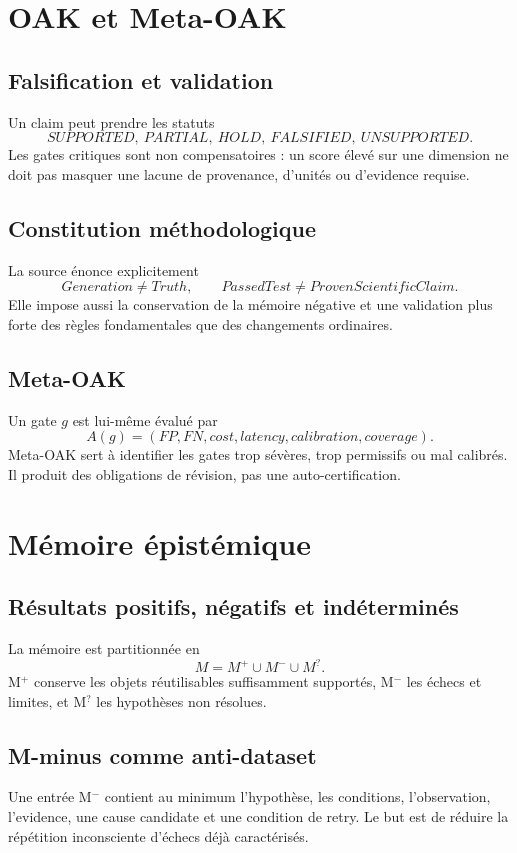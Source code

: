 \chapter{OAK et Meta-OAK}

\section{Falsification et validation}
Un claim peut prendre les statuts
\[
SUPPORTED,\ PARTIAL,\ HOLD,\ FALSIFIED,\ UNSUPPORTED.
\]
Les gates critiques sont non compensatoires : un score élevé sur une dimension ne doit pas masquer une lacune de provenance, d'unités ou d'evidence requise.

\section{Constitution méthodologique}
La source énonce explicitement
\[
Generation\neq Truth,\qquad PassedTest\neq ProvenScientificClaim.
\]
Elle impose aussi la conservation de la mémoire négative et une validation plus forte des règles fondamentales que des changements ordinaires.

\section{Meta-OAK}
Un gate $g$ est lui-même évalué par
\[
A(g)=(FP,FN,cost,latency,calibration,coverage).
\]
Meta-OAK sert à identifier les gates trop sévères, trop permissifs ou mal calibrés. Il produit des obligations de révision, pas une auto-certification.

\chapter{Mémoire épistémique}

\section{Résultats positifs, négatifs et indéterminés}
La mémoire est partitionnée en
\[
M=M^+\cup M^-\cup M^?.
\]
M$^+$ conserve les objets réutilisables suffisamment supportés, M$^-$ les échecs et limites, et M$^?$ les hypothèses non résolues.

\section{M-minus comme anti-dataset}
Une entrée M$^-$ contient au minimum l'hypothèse, les conditions, l'observation, l'evidence, une cause candidate et une condition de retry. Le but est de réduire la répétition inconsciente d'échecs déjà caractérisés.


